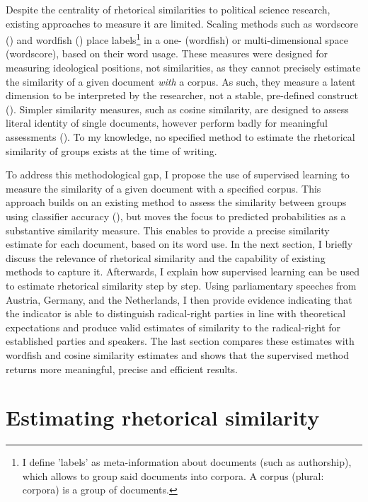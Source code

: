 \documentclass{article}
\begin{document}
Despite the centrality of rhetorical similarities to political science research, existing approaches to measure it are limited. Scaling methods such as wordscore (\cite{Laver2003}) and wordfish (\cite{Slapin2008}) place labels\footnote{I define 'labels' as meta-information about documents (such as authorship), which allows to group said documents into corpora. A corpus (plural: corpora) is a group of documents.} in a one- (wordfish) or multi-dimensional space (wordscore), based on their word usage. These measures were designed for measuring ideological positions, not similarities, as they cannot precisely estimate the similarity of a given document \textit{with} a corpus. As such, they measure a latent dimension to be interpreted by the researcher, not a stable, pre-defined construct (\cite{Goet2019}). Simpler similarity measures, such as cosine similarity, are designed to assess literal identity of single documents, however perform badly for meaningful assessments (\cite{Prasetya2018}). To my knowledge, no specified method to estimate the rhetorical similarity of groups exists at the time of writing.\par

To address this methodological gap, I propose the use of supervised learning to measure the similarity of a given document with a specified corpus. This approach builds on an existing method to assess the similarity between groups using classifier accuracy (\cite{Peterson2018}), but moves the focus to predicted probabilities as a substantive similarity measure. This enables to provide a precise similarity estimate for each document, based on its word use. In the next section, I briefly discuss the relevance of rhetorical similarity and the capability of existing methods to capture it. Afterwards, I explain how supervised learning can be used to estimate rhetorical similarity step by step. Using parliamentary speeches from Austria, Germany, and the Netherlands, I then provide evidence indicating that the indicator is able to distinguish radical-right parties in line with theoretical expectations and produce valid estimates of similarity to the radical-right for established parties and speakers. The last section compares these estimates with wordfish and cosine similarity estimates and shows that the supervised method returns more meaningful, precise and efficient results.\par


\section{Estimating rhetorical similarity}
\end{document}

